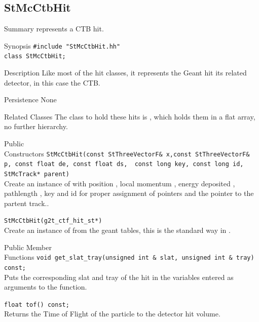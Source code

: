 \subsection{StMcCtbHit}
\label{sec:StMcCtbHit}
\begin{Entry}
\item[Summary]
     represents a CTB hit.
\item[Synopsis]
    \verb+#include "StMcCtbHit.hh"+\\
    \verb+class StMcCtbHit;+\\

\item[Description]
Like most of the hit classes, it represents the Geant hit its related detector, in
this case the CTB.
\item[Persistence]
    None

\item[Related Classes]
The class to hold these hits is , which holds them in a flat
array, no further hierarchy.
\item[Public\\ Constructors]
    \verb+StMcCtbHit(const StThreeVectorF& x,const StThreeVectorF& p, const float de, const float ds,  const long key, const long id, StMcTrack* parent)+\\
    Create an instance of  with position ,
    local momentum , energy deposited , pathlength ,
    key and id for proper assignment of pointers and the pointer to the partent track..

    \verb+StMcCtbHit(g2t_ctf_hit_st*)+\\
    Create an instance of  from the geant tables, this is the
    standard way in .

\item[Public Member\\ Functions]
    \verb+void get_slat_tray(unsigned int & slat, unsigned int & tray) const;+\\
    Puts the corresponding slat and tray of the hit in the variables entered as arguments to the function.

    \verb+float tof() const;+\\
    Returns the Time of Flight of the particle to the detector hit volume.

\end{Entry}
%
%
